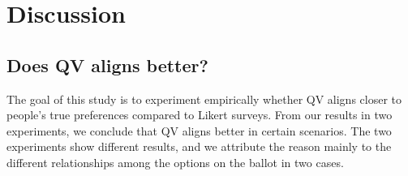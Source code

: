 \section{Discussion} \label{discussion}

\subsection{Does QV aligns better?}
The goal of this study is to 
experiment empirically whether
QV aligns closer to people's true preferences
compared to Likert surveys.
From our results in two experiments,
we conclude that QV aligns better 
in certain scenarios. The two experiments show different results, and we attribute the reason mainly to the different relationships among
the options on the ballot in two cases. 

